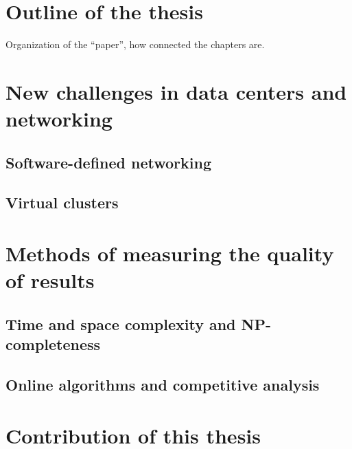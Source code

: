 \section{Outline of the thesis}

Organization of the ``paper'', how connected the chapters are.


\section{New challenges in data centers and networking}

\subsection{Software-defined networking}
\subsection{Virtual clusters}


\section{Methods of measuring the quality of results}

\subsection{Time and space complexity and NP-completeness}
\subsection{Online algorithms and competitive analysis}

\section{Contribution of this thesis}